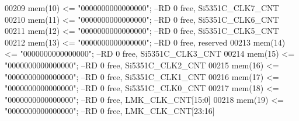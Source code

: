 \begin{DoxyCode}
00209             \textcolor{vhdlchar}{mem}\textcolor{vhdlchar}{(}\textcolor{vhdllogic}{}\textcolor{vhdllogic}{10}\textcolor{vhdlchar}{)} \textcolor{vhdlchar}{<=} \textcolor{vhdllogic}{"0000000000000000"};\textcolor{keyword}{ --RD 0 free, Si5351C\_CLK7\_CNT}
00210             \textcolor{vhdlchar}{mem}\textcolor{vhdlchar}{(}\textcolor{vhdllogic}{}\textcolor{vhdllogic}{11}\textcolor{vhdlchar}{)} \textcolor{vhdlchar}{<=} \textcolor{vhdllogic}{"0000000000000000"};\textcolor{keyword}{ --RD 0 free, Si5351C\_CLK6\_CNT}
00211             \textcolor{vhdlchar}{mem}\textcolor{vhdlchar}{(}\textcolor{vhdllogic}{}\textcolor{vhdllogic}{12}\textcolor{vhdlchar}{)}  \textcolor{vhdlchar}{<=} \textcolor{vhdllogic}{"0000000000000000"};\textcolor{keyword}{ --RD    0 free, Si5351C\_CLK5\_CNT}
00212             \textcolor{vhdlchar}{mem}\textcolor{vhdlchar}{(}\textcolor{vhdllogic}{}\textcolor{vhdllogic}{13}\textcolor{vhdlchar}{)} \textcolor{vhdlchar}{<=} \textcolor{vhdllogic}{"0000000000000000"};\textcolor{keyword}{ --RD 0 free, reserved}
00213             \textcolor{vhdlchar}{mem}\textcolor{vhdlchar}{(}\textcolor{vhdllogic}{}\textcolor{vhdllogic}{14}\textcolor{vhdlchar}{)}  \textcolor{vhdlchar}{<=} \textcolor{vhdllogic}{"0000000000000000"};\textcolor{keyword}{ --RD    0 free, Si5351C\_CLK3\_CNT}
00214             \textcolor{vhdlchar}{mem}\textcolor{vhdlchar}{(}\textcolor{vhdllogic}{}\textcolor{vhdllogic}{15}\textcolor{vhdlchar}{)} \textcolor{vhdlchar}{<=} \textcolor{vhdllogic}{"0000000000000000"};\textcolor{keyword}{ --RD 0 free, Si5351C\_CLK2\_CNT}
00215             \textcolor{vhdlchar}{mem}\textcolor{vhdlchar}{(}\textcolor{vhdllogic}{}\textcolor{vhdllogic}{16}\textcolor{vhdlchar}{)}  \textcolor{vhdlchar}{<=} \textcolor{vhdllogic}{"0000000000000000"};\textcolor{keyword}{ --RD    0 free, Si5351C\_CLK1\_CNT}
00216             \textcolor{vhdlchar}{mem}\textcolor{vhdlchar}{(}\textcolor{vhdllogic}{}\textcolor{vhdllogic}{17}\textcolor{vhdlchar}{)} \textcolor{vhdlchar}{<=} \textcolor{vhdllogic}{"0000000000000000"};\textcolor{keyword}{ --RD 0 free, Si5351C\_CLK0\_CNT}
00217             \textcolor{vhdlchar}{mem}\textcolor{vhdlchar}{(}\textcolor{vhdllogic}{}\textcolor{vhdllogic}{18}\textcolor{vhdlchar}{)} \textcolor{vhdlchar}{<=} \textcolor{vhdllogic}{"0000000000000000"};\textcolor{keyword}{ --RD 0 free, LMK\_CLK\_CNT[15:0]   }
00218             \textcolor{vhdlchar}{mem}\textcolor{vhdlchar}{(}\textcolor{vhdllogic}{}\textcolor{vhdllogic}{19}\textcolor{vhdlchar}{)} \textcolor{vhdlchar}{<=} \textcolor{vhdllogic}{"0000000000000000"};\textcolor{keyword}{ --RD 0 free, LMK\_CLK\_CNT[23:16]          }

\end{DoxyCode}
